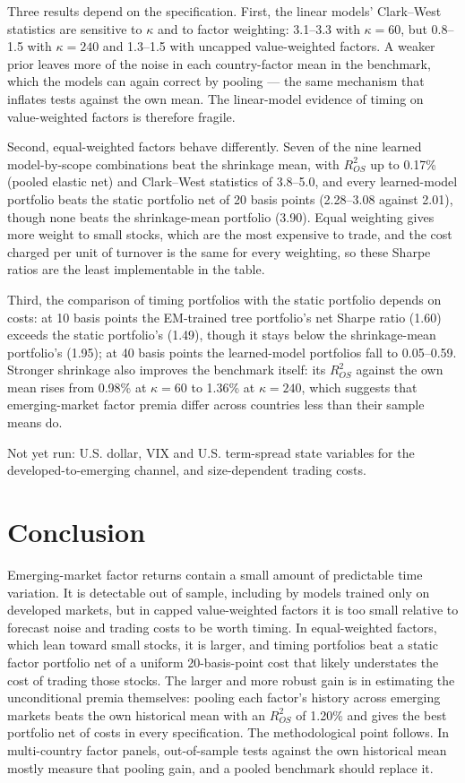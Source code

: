 \documentclass[11pt]{article}
\begin{document}
Three results depend on the specification. First, the linear models' Clark--West statistics are sensitive to $\kappa$ and to factor weighting: 3.1--3.3 with $\kappa = 60$, but 0.8--1.5 with $\kappa = 240$ and 1.3--1.5 with uncapped value-weighted factors. A weaker prior leaves more of the noise in each country-factor mean in the benchmark, which the models can again correct by pooling --- the same mechanism that inflates tests against the own mean. The linear-model evidence of timing on value-weighted factors is therefore fragile.

Second, equal-weighted factors behave differently. Seven of the nine learned model-by-scope combinations beat the shrinkage mean, with $R^2_{OS}$ up to 0.17\% (pooled elastic net) and Clark--West statistics of 3.8--5.0, and every learned-model portfolio beats the static portfolio net of 20 basis points (2.28--3.08 against 2.01), though none beats the shrinkage-mean portfolio (3.90). Equal weighting gives more weight to small stocks, which are the most expensive to trade, and the cost charged per unit of turnover is the same for every weighting, so these Sharpe ratios are the least implementable in the table.

Third, the comparison of timing portfolios with the static portfolio depends on costs: at 10 basis points the EM-trained tree portfolio's net Sharpe ratio (1.60) exceeds the static portfolio's (1.49), though it stays below the shrinkage-mean portfolio's (1.95); at 40 basis points the learned-model portfolios fall to 0.05--0.59. Stronger shrinkage also improves the benchmark itself: its $R^2_{OS}$ against the own mean rises from 0.98\% at $\kappa = 60$ to 1.36\% at $\kappa = 240$, which suggests that emerging-market factor premia differ across countries less than their sample means do.

Not yet run: U.S. dollar, VIX and U.S. term-spread state variables for the developed-to-emerging channel, and size-dependent trading costs.



\section{Conclusion}
Emerging-market factor returns contain a small amount of predictable time variation. It is detectable out of sample, including by models trained only on developed markets, but in capped value-weighted factors it is too small relative to forecast noise and trading costs to be worth timing. In equal-weighted factors, which lean toward small stocks, it is larger, and timing portfolios beat a static factor portfolio net of a uniform 20-basis-point cost that likely understates the cost of trading those stocks. The larger and more robust gain is in estimating the unconditional premia themselves: pooling each factor's history across emerging markets beats the own historical mean with an $R^2_{OS}$ of 1.20\% and gives the best portfolio net of costs in every specification. The methodological point follows. In multi-country factor panels, out-of-sample tests against the own historical mean mostly measure that pooling gain, and a pooled benchmark should replace it.
\end{document}
